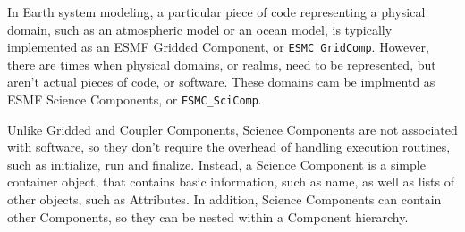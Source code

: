 %


\label{sec:SciComp}

In Earth system modeling, a particular piece of code representing a physical 
domain, such as an atmospheric model or an ocean model, is typically 
implemented as an ESMF Gridded Component, or {\tt ESMC\_GridComp}.  
However, there are times when physical domains, or realms, need to be 
represented, but aren't actual pieces of code, or software.  These domains 
cam be implmentd as ESMF Science Components, or {\tt ESMC\_SciComp}.

Unlike Gridded and Coupler Components, Science Components are not associated 
with software, so they don't require the overhead of handling execution 
routines, such as initialize, run and finalize.  Instead, a Science Component 
is a simple container object, that contains basic information, such as name,
as well as lists of other objects, such as Attributes.  In addition, Science
Components can contain other Components, so they can be nested within a
Component hierarchy.

